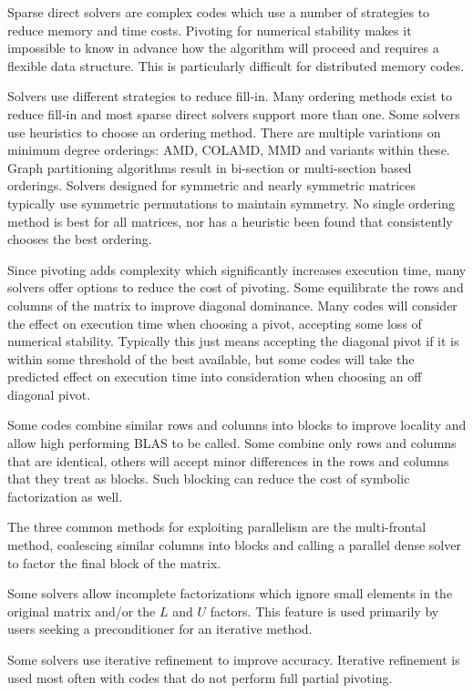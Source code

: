 \documentclass[acmtocl]{acmtrans2m}
\begin{document}
\bigskip

Sparse direct solvers are complex codes which use a number of
strategies to reduce memory and time costs.  Pivoting for numerical
stability makes it impossible to know in advance how the algorithm
will proceed and requires a flexible data structure.  This is
particularly difficult for distributed memory codes.  

Solvers use different strategies to reduce fill-in.  Many ordering
methods exist to reduce fill-in and most sparse direct solvers support
more than one.  Some solvers use heuristics to choose an ordering method.  There are multiple variations on minimum degree orderings: AMD,
COLAMD, MMD and variants within these.  Graph partitioning algorithms
result in bi-section or multi-section based orderings.  Solvers
designed for symmetric and nearly symmetric matrices typically use
symmetric permutations to maintain symmetry.  No single ordering
method is best for all matrices, nor has a heuristic been found that
consistently chooses the best ordering.

Since pivoting adds complexity which significantly increases execution
time, many solvers offer options to reduce the cost of pivoting.  Some
equilibrate the rows and columns of the matrix to improve diagonal
dominance.  Many codes will consider the effect on execution time when
choosing a pivot, accepting some loss of numerical stability.
Typically this just means accepting the diagonal pivot if it is within
some threshold of the best available, but some codes will take the
predicted effect on execution time into consideration when choosing an off
diagonal pivot.

Some codes combine similar rows and columns into blocks to improve
locality and allow high performing BLAS to be called.  Some combine
only rows and columns that are identical, others will accept minor
differences in the rows and columns that they treat as blocks.  Such
blocking can reduce the cost of symbolic factorization as well.

The three common methods for exploiting parallelism are the
multi-frontal method, coalescing  similar 
columns into blocks and calling a parallel dense solver 
to factor the final block of the matrix.

Some solvers allow incomplete factorizations which ignore small
elements in the original matrix and/or the $L$ and $U$ factors.
This feature is used primarily by users seeking a
preconditioner for an iterative method.

Some solvers use iterative refinement to improve accuracy.  Iterative
refinement is used most often with codes that do not perform full partial pivoting.  
\end{document}
